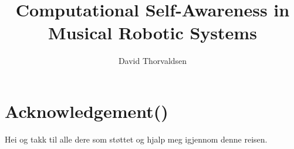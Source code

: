 \title{Computational Self-Awareness in Musical Robotic Systems} %
\author{David Thorvaldsen}
\duoforside[dept={Institute for Informatics}, program={Informatics: Robotics and Intelligent Systems}, long]

\newpage

\chapter*{Acknowledgement()} %
Hei og takk til alle dere som støttet og hjalp meg igjennom denne reisen.
\newpage

\tableofcontents
\newpage

\listoftables
\newpage

\listoffigures
\newpage

\setcounter{page}{1}